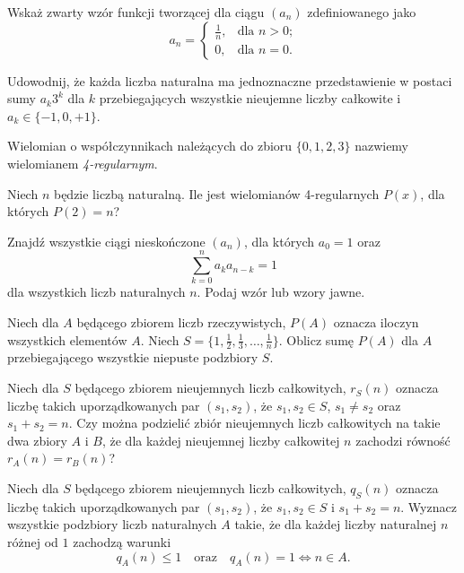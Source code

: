 \documentclass[shortabstract]{imthesis}
\begin{document}
\begin{problem} \label{problem:logfun}
Wskaż zwarty wzór funkcji tworzącej dla ciągu $(a_n)$ zdefiniowanego jako
$$
a_n = \begin{cases} \frac{1}{n}, &\text{dla $n > 0$;} \\ 0, &\text{dla $n = 0$.} \end{cases}
$$
\end{problem}
\begin{problem} \label{problem:ternary}
Udowodnij, że każda liczba naturalna ma jednoznaczne przedstawienie w postaci sumy $a_k3^k$ dla $k$ przebiegających wszystkie nieujemne liczby całkowite i $a_k \in \{-1, 0, +1\}$.
\end{problem}
\begin{problem} \label{problem:poly2}
Wielomian o współczynnikach należących do zbioru $\{0, 1, 2, 3\}$ nazwiemy wielomianem \emph{4-regularnym}. 

Niech $n$ będzie liczbą naturalną. Ile jest wielomianów 4-regularnych $P(x)$, dla których $P(2) = n$?
\end{problem}
\begin{problem} \label{problem:cauchyidp}
Znajdź wszystkie ciągi nieskończone $(a_n)$, dla których $a_0 = 1$ oraz
$$
\sum_{k=0}^n a_ka_{n-k} = 1
$$
dla wszystkich liczb naturalnych $n$. Podaj wzór lub wzory jawne.
\end{problem}
\begin{problem} \label{problem:subsetprod}
Niech dla $A$ będącego zbiorem liczb rzeczywistych, $P(A)$ oznacza iloczyn wszystkich elementów $A$. Niech $S = \{1, \frac12, \frac13, \ldots, \frac{1}{n}\}$. Oblicz sumę $P(A)$ dla $A$ przebiegającego wszystkie niepuste podzbiory $S$.
\end{problem}
\begin{problem} \label{problem:rs}
Niech dla $S$ będącego zbiorem nieujemnych liczb całkowitych, $r_S(n)$ oznacza liczbę takich uporządkowanych par $(s_1, s_2)$, że $s_1, s_2 \in S$, $s_1 \neq s_2$ oraz $s_1+s_2 = n$. Czy można podzielić zbiór nieujemnych liczb całkowitych na takie dwa zbiory $A$ i $B$, że dla każdej nieujemnej liczby całkowitej $n$ zachodzi równość $r_A(n) = r_B(n)$?
\end{problem}
\begin{problem} \label{problem:qs}
Niech dla $S$ będącego zbiorem nieujemnych liczb całkowitych, 
$q_S(n)$ oznacza liczbę takich uporządkowanych par $(s_1, s_2)$, że $s_1, s_2 \in S$ i $s_1+s_2 = n$. Wyznacz wszystkie podzbiory liczb naturalnych $A$ takie, że dla każdej liczby naturalnej $n$ różnej od $1$ zachodzą warunki
$$
q_A(n) \leq 1 \quad\text{oraz}\quad q_A(n) = 1 \iff n \in A.
$$
\end{problem}
\end{document}
